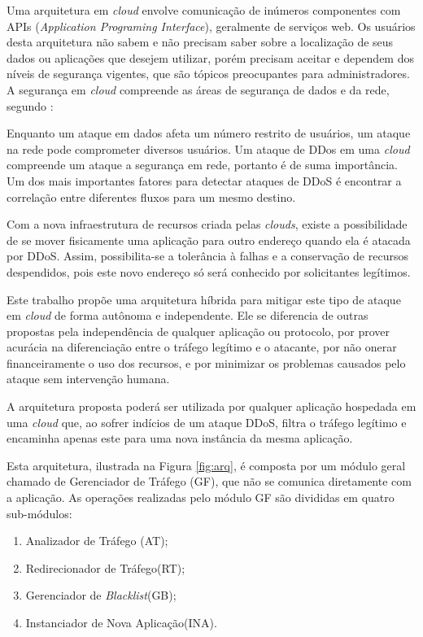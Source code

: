

Uma arquitetura em \emph{cloud} envolve comunicação de inúmeros componentes com APIs (\emph{Application Programing Interface}), geralmente de serviços web. Os usuários desta arquitetura não sabem e não precisam saber sobre a localização de seus dados ou aplicações que desejem utilizar, porém precisam aceitar e dependem  dos níveis de segurança vigentes, que são tópicos preocupantes para administradores.
A segurança em \emph{cloud} compreende as áreas de segurança de dados e da rede, segundo \cite{Dhage:2011:IDS:1980022.1980076}:  

Enquanto um ataque em dados afeta um número restrito de usuários, um ataque na rede pode comprometer diversos usuários. Um ataque de DDos em uma \emph{cloud} compreende um ataque a segurança em rede, portanto é de suma importância. 
Um dos mais importantes fatores para detectar ataques de DDoS é encontrar a correlação entre diferentes fluxos para um mesmo destino.

Com a nova infraestrutura de recursos criada pelas \emph{clouds}, existe a possibilidade de se mover fisicamente uma aplicação para outro endereço quando ela é atacada por DDoS. Assim, possibilita-se a tolerância à falhas e a conservação de recursos despendidos, pois este novo endereço só será conhecido por solicitantes legítimos.

Este trabalho propõe uma arquitetura híbrida para mitigar este tipo de ataque em \emph{cloud} de forma autônoma e independente. Ele se diferencia de outras propostas pela independência de qualquer aplicação ou protocolo, por prover acurácia na diferenciação entre o tráfego legítimo e o atacante, por não onerar financeiramente o uso dos recursos, e por minimizar os problemas causados pelo ataque sem intervenção humana.

A arquitetura proposta poderá ser utilizada por qualquer aplicação hospedada em uma \emph{cloud} que, ao sofrer indícios de um ataque DDoS, filtra o tráfego legítimo e encaminha apenas este para uma nova instância da mesma aplicação. 

Esta arquitetura, ilustrada na Figura \ref{fig:arq}, é composta por um módulo geral chamado de Gerenciador de Tráfego (GF), que não se comunica diretamente com a aplicação. As operações realizadas pelo módulo GF são divididas em quatro sub-módulos:

\begin{enumerate}[i]
  \item Analizador de Tráfego (AT);
  \item Redirecionador de Tráfego(RT);
  \item Gerenciador de \emph{Blacklist}(GB);
  \item Instanciador de Nova Aplicação(INA).
\end{enumerate}

